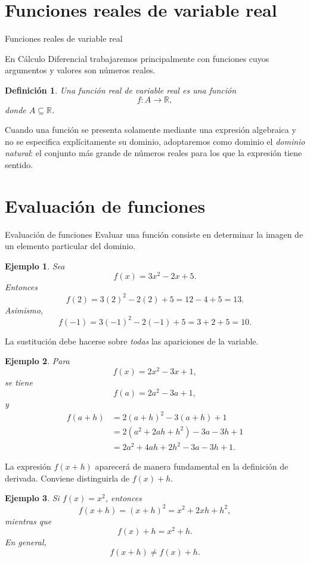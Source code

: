 \documentclass[aspectratio=169,10pt]{beamer}
\newtheorem{definicion}{Definición}
\newtheorem{ejemplo}{Ejemplo}
\newcommand{\R}{\mathbb{R}}
\begin{document}
\section{Funciones reales de variable real}
\begin{frame}{Funciones reales de variable real}

En Cálculo Diferencial trabajaremos principalmente con funciones cuyos
argumentos y valores son números reales.

\begin{definicion}
Una función real de variable real es una función
\[
f:A\to\R,
\]
donde $A\subseteq\R$.
\end{definicion}

Cuando una función se presenta solamente mediante una expresión algebraica y
no se especifica explícitamente su dominio, adoptaremos como dominio el
\emph{dominio natural}: el conjunto más grande de números reales para los que
la expresión tiene sentido.

\end{frame}
\section{Evaluación de funciones}
\begin{frame}{Evaluación de funciones}
Evaluar una función consiste en determinar la imagen de un elemento particular
del dominio.

\begin{ejemplo}
Sea
\[
f(x)=3x^2-2x+5.
\]
Entonces
\[
f(2)=3(2)^2-2(2)+5=12-4+5=13.
\]
Asimismo,
\[
f(-1)=3(-1)^2-2(-1)+5=3+2+5=10.
\]
\end{ejemplo}

La sustitución debe hacerse sobre \emph{todas} las apariciones de la variable.

\begin{ejemplo}
Para
\[
f(x)=2x^2-3x+1,
\]
se tiene
\[
f(a)=2a^2-3a+1,
\]
y
\begin{align*}
f(a+h)
 &=2(a+h)^2-3(a+h)+1\\
 &=2(a^2+2ah+h^2)-3a-3h+1\\
 &=2a^2+4ah+2h^2-3a-3h+1.
\end{align*}
\end{ejemplo}

La expresión $f(x+h)$ aparecerá de manera fundamental en la definición de
derivada. Conviene distinguirla de $f(x)+h$.

\begin{ejemplo}
Si $f(x)=x^2$, entonces
\[
f(x+h)=(x+h)^2=x^2+2xh+h^2,
\]
mientras que
\[
f(x)+h=x^2+h.
\]
En general,
\[
f(x+h)\neq f(x)+h.
\]
\end{ejemplo}
\end{frame}
\end{document}
